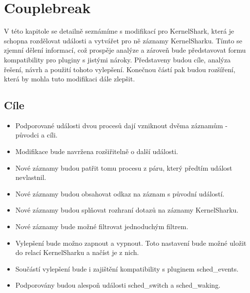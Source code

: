 \chapter{Couplebreak}
V této kapitole se detailně seznámíme s modifikací pro KernelShark, která je schopna rozdělovat události a vytvářet pro ně záznamy KernelSharku. Tímto se zjemní dělení informací, což prospěje analýze a zároveň bude představovat formu kompatibility pro pluginy s jistými nároky. Představeny budou cíle, analýza řešení, návrh a použití tohoto vylepšení. Konečnou částí pak budou rozšíření, která by mohla tuto modifikaci dále zlepšit.

\section{Cíle}
\begin{itemize}
    \item Podporované události dvou procesů dají vzniknout dvěma záznamům - původci a cíli.
    \item Modifikace bude navržena rozšiřitelně o další události.
    \item Nové záznamy budou patřit tomu procesu z páru, který předtím událost nevlastnil.
    \item Nové záznamy budou obsahovat odkaz na záznam s původní událostí.
    \item Nové záznamy budou splňovat rozhraní dotazů na záznamy KernelSharku.
    \item Nové záznamy bude možné filtrovat jednoduchým filtrem.
    \item Vylepšení bude možno zapnout a vypnout. Toto nastavení bude možné uložit do relací KernelSharku a načíst je z nich.
    \item Součástí vylepšení bude i zajištění kompatibility s pluginem sched\_events.
    \item Podporovány budou alespoň události sched\_switch a sched\_waking.
\end{itemize}

